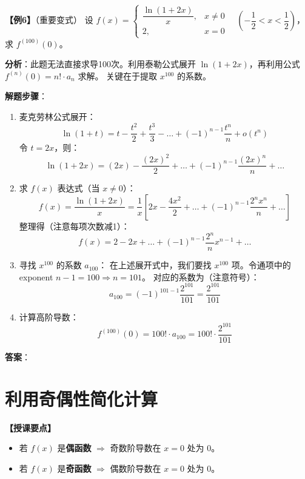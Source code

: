 \documentclass[12pt,a4paper]{article}
\begin{document}
\vspace{2em}

\textbf{【例6】}（重要变式）
设 $ f(x) = \begin{cases} \dfrac{\ln(1+2x)}{x}, & x \neq 0 \\ 2, & x=0 \end{cases} \quad \left(-\dfrac{1}{2} < x < \dfrac{1}{2}\right) $，求 $ f^{(100)}(0) $。

\begin{tiptip}
\textbf{分析}：此题无法直接求导100次。利用泰勒公式展开 $\ln(1+2x)$，再利用公式 $f^{(n)}(0) = n! \cdot a_n$ 求解。
关键在于提取 $x^{100}$ 的系数。
\end{tiptip}

\textbf{解题步骤}：
\begin{enumerate}
    \item 麦克劳林公式展开：
    \[ \ln(1+t) = t - \dfrac{t^2}{2} + \dfrac{t^3}{3} - \dots + (-1)^{n-1}\dfrac{t^n}{n} + o(t^n) \]
    令 $t=2x$，则：
    \[ \ln(1+2x) = (2x) - \dfrac{(2x)^2}{2} + \dots + (-1)^{n-1}\dfrac{(2x)^n}{n} + \dots \]
    \item 求 $f(x)$ 表达式（当 $x \neq 0$）：
    \[ f(x) = \dfrac{\ln(1+2x)}{x} = \dfrac{1}{x} \left[ 2x - \dfrac{4x^2}{2} + \dots + (-1)^{n-1}\dfrac{2^n x^n}{n} + \dots \right] \]
    整理得（注意每项次数减1）：
    \[ f(x) = 2 - 2x + \dots + (-1)^{n-1}\dfrac{2^n}{n} x^{n-1} + \dots \]
    \item 寻找 $x^{100}$ 的系数 $a_{100}$：
    在上述展开式中，我们要找 $x^{100}$ 项。令通项中的 exponent $n-1 = 100 \Rightarrow n = 101$。
    对应的系数为（注意符号）：
    \[ a_{100} = (-1)^{101-1} \dfrac{2^{101}}{101} = \dfrac{2^{101}}{101} \]
    \item 计算高阶导数：
    \[ f^{(100)}(0) = 100! \cdot a_{100} = 100! \cdot \dfrac{2^{101}}{101} \]
\end{enumerate}
\textbf{答案}：

\vspace{2em}

\section{利用奇偶性简化计算}

\textbf{【授课要点】}
\begin{itemize}
    \item 若 $f(x)$ 是\textbf{偶函数} $\Rightarrow$ 奇数阶导数在 $x=0$ 处为 0。
    \item 若 $f(x)$ 是\textbf{奇函数} $\Rightarrow$ 偶数阶导数在 $x=0$ 处为 0。
\end{itemize}
\end{document}
